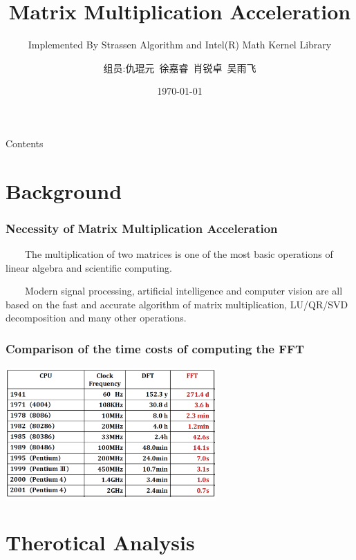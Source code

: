 \documentclass[cjk]{beamer}
\author{组员:仇琨元\ 徐嘉睿\ 肖锐卓\ 吴雨飞}
\title{Matrix Multiplication Acceleration}
\subtitle{Implemented By Strassen Algorithm and Intel(R) Math Kernel Library}
\institute{Insitute of EEE \\ SUSTech}
\date{\today}
\begin{document}
\begin{frame}[plain]
  \titlepage
\end{frame}

\begin{frame}{Contents}
  \tableofcontents
\end{frame}



\section{Background}
\begin{frame}
  \frametitle{\textbf{Necessity of Matrix Multiplication Acceleration}}
  \vspace{5mm}
  \small
  ~~~~The multiplication of two matrices is one of the most basic operations of linear algebra and scientific computing.

  ~~~~Modern signal processing, artificial intelligence and computer vision are all based on the fast and accurate algorithm of matrix multiplication, LU/QR/SVD decomposition and many other operations.

\end{frame}
\begin{frame}
  \frametitle{\small\textbf{Comparison of the time costs of computing the FFT}}

  \includegraphics[height=5.0cm]{fftvel.png}

\end{frame}


\section{Therotical Analysis}
\end{document}
